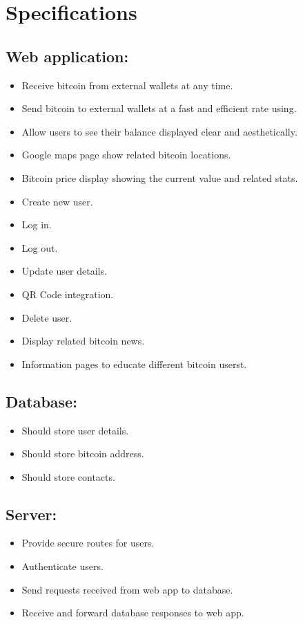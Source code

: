 \section{Specifications}
\subsection{Web application:}
\begin{itemize}
  \item Receive bitcoin from external wallets at any time.
  \item Send bitcoin to external wallets at a fast and efficient rate using.
  \item Allow users to see their balance displayed clear and aesthetically.
  \item Google maps page show related bitcoin locations.
  \item Bitcoin price display showing the current value and related stats.
  \item Create new user.
  \item Log in.
  \item Log out.
  \item Update user details.
  \item QR Code integration.
  \item Delete user.
  \item Display related bitcoin news.
  \item Information pages to educate different bitcoin userst.
\end{itemize}

\subsection{Database:}
\begin{itemize}
  \item Should store user details.
  \item Should store bitcoin address.
  \item Should store contacts.
\end{itemize}

\subsection{Server:}
\begin{itemize}
  \item Provide secure routes for users.
  \item Authenticate users.
  \item Send requests received from web app to database.
  \item Receive and forward database responses to web app.
\end{itemize}


